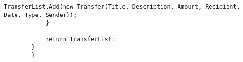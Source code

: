 \begin{lstlisting}[caption={Uddrag af filen "db.cs" fra kildekoden til programmet},label={lst:sqlite}]
                TransferList.Add(new Transfer(Title, Description, Amount, Recipient, Date, Type, Sender));
            }

            return TransferList;
        }
        }
\end{lstlisting}
